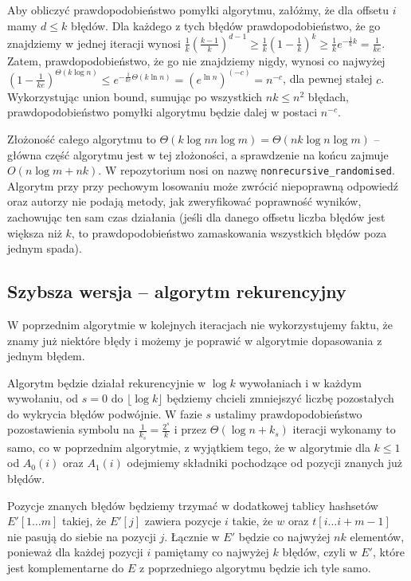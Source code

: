 \documentclass[a4paper,12pt]{article}
\theoremstyle{definition}
\begin{document}
Aby obliczyć prawdopodobieństwo pomyłki algorytmu, załóżmy, że dla offsetu $i$ mamy $d \le k$ błędów. Dla każdego z tych błędów prawdopodobieństwo, że go znajdziemy w jednej iteracji wynosi $\frac{1}{k}(\frac{k-1}{k})^{d-1} \ge \frac{1}{k}(1-\frac{1}{k})^k \ge \frac{1}{k}e^{-\frac{1}{k}k} = \frac{1}{ke}$. Zatem, prawdopodobieństwo, że go nie znajdziemy nigdy, wynosi co najwyżej $(1-\frac{1}{ke})^{\Theta(k \log n)} \le e^{-\frac{1}{ke}\Theta(k \ln n)} = (e^{\ln n})^{(-c)} = n^{-c}$, dla pewnej stałej $c$. Wykorzystując union bound, sumując po wszystkich $nk \le n^2$ błędach, prawdopodobieństwo pomyłki algorytmu będzie dalej w postaci $n^{-c}$.

Złożoność całego algorytmu to $\Theta(k \log n n \log m) = \Theta(nk \log n \log m)$ -- główna część algorytmu jest w tej złożoności, a sprawdzenie na końcu zajmuje $O(n \log m + nk)$. W repozytorium nosi on nazwę \texttt{nonrecursive\_randomised}. Algorytm przy przy pechowym losowaniu może zwrócić niepoprawną odpowiedź oraz autorzy nie podają metody, jak zweryfikować poprawność wyników, zachowując ten sam czas działania (jeśli dla danego offsetu liczba błędów jest większa niż $k$, to prawdopodobieństwo zamaskowania wszystkich błędów poza jednym spada).

\subsection{Szybsza wersja -- algorytm rekurencyjny}
W poprzednim algorytmie w kolejnych iteracjach nie wykorzystujemy faktu, że znamy już niektóre błędy i możemy je poprawić w algorytmie dopasowania z jednym błędem.

Algorytm będzie działał rekurencyjnie w $\log k$ wywołaniach i w każdym wywołaniu, od $s=0$ do $\lfloor \log k \rfloor$ będziemy chcieli zmniejszyć liczbę pozostałych do wykrycia błędów podwójnie. W fazie $s$ ustalimy prawdopodobieństwo pozostawienia symbolu na $\frac{1}{k_s} = \frac{2^s}{k}$ i przez $\Theta(\log n + k_s)$ iteracji wykonamy to samo, co w poprzednim algorytmie, z wyjątkiem tego, że w algorytmie dla $k \le 1$ od $A_0(i)$ oraz $A_1(i)$ odejmiemy składniki pochodzące od pozycji znanych już błędów.

Pozycje znanych błędów będziemy trzymać w dodatkowej tablicy hashsetów $E'[1\dots m]$ takiej, że $E'[j]$ zawiera pozycje $i$ takie, że $w$ oraz $t[i\dots i+m-1]$ nie pasują do siebie na pozycji $j$. Łącznie w $E'$ będzie co najwyżej $nk$ elementów, ponieważ dla każdej pozycji $i$ pamiętamy co najwyżej $k$ błędów, czyli w $E'$, które jest komplementarne do $E$ z poprzedniego algorytmu będzie ich tyle samo.
\end{document}
